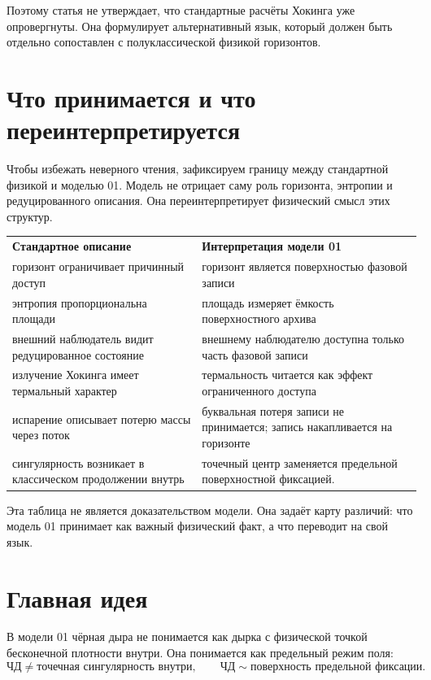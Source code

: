 \documentclass[11pt,a4paper]{article}
\begin{document}
Поэтому статья не утверждает, что стандартные расчёты Хокинга уже опровергнуты. Она формулирует альтернативный язык, который должен быть отдельно сопоставлен с полуклассической физикой горизонтов.

\section{Что принимается и что переинтерпретируется}

Чтобы избежать неверного чтения, зафиксируем границу между стандартной физикой и моделью 01. Модель не отрицает саму роль горизонта, энтропии и редуцированного описания. Она переинтерпретирует физический смысл этих структур.

\begin{center}
\begin{tabular}{>{\raggedright\arraybackslash}p{}>{\raggedright\arraybackslash}p{}}
\textbf{Стандартное описание} & \textbf{Интерпретация модели 01} \\
горизонт ограничивает причинный доступ & горизонт является поверхностью фазовой записи \\
энтропия пропорциональна площади & площадь измеряет ёмкость поверхностного архива \\
внешний наблюдатель видит редуцированное состояние & внешнему наблюдателю доступна только часть фазовой записи \\
излучение Хокинга имеет термальный характер & термальность читается как эффект ограниченного доступа \\
испарение описывает потерю массы через поток & буквальная потеря записи не принимается; запись накапливается на горизонте \\
сингулярность возникает в классическом продолжении внутрь & точечный центр заменяется предельной поверхностной фиксацией.
\end{tabular}
\end{center}

Эта таблица не является доказательством модели. Она задаёт карту различий: что модель 01 принимает как важный физический факт, а что переводит на свой язык.


\section{Главная идея}

В модели 01 чёрная дыра не понимается как дырка с физической точкой бесконечной плотности внутри. Она понимается как предельный режим поля:
\begin{equation}
\text{ЧД} \neq \text{точечная сингулярность внутри},
\qquad
\text{ЧД} \sim \text{поверхность предельной фиксации}.
\end{equation}
\end{document}
